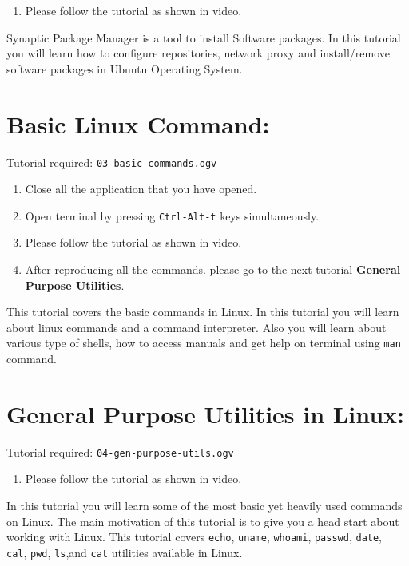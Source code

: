 \documentclass[11pt]{article}
\newenvironment{enumcpt}{\begin{enumerate} \topsep 0pt \partopsep 0pt 
                        \parsep 0pt
                        \itemsep 0pt \leftmargin -1in \rightmargin 0pt
                        }{\end{enumerate}}
\begin{document}
\begin{multicols}{2}
\begin{enumcpt}
\item Please follow the tutorial as shown in video.
\end{enumcpt}

 Synaptic Package Manager is a tool to install Software packages. In
 this tutorial you will learn how to configure repositories, network
 proxy and install/remove software packages in Ubuntu Operating
 System.

\section{Basic Linux Command:}
Tutorial required: {\tt 03-basic-commands.ogv} 

\begin{enumcpt}
\item Close all the application that you have opened.
\item Open terminal by pressing {\tt Ctrl-Alt-t} keys simultaneously.
\item Please follow the tutorial as shown in video.
\item After reproducing all the commands. please go to the next
  tutorial \textbf {General Purpose Utilities}.
\end{enumcpt}

This tutorial covers the basic commands in Linux. In this tutorial you
will learn about linux commands and a command interpreter. Also you will
learn about various type of shells, how to access manuals and get
help on terminal using {\tt man} command.

\section{General Purpose Utilities in Linux:}
Tutorial required: {\tt 04-gen-purpose-utils.ogv} 

\begin{enumcpt}
\item Please follow the tutorial as shown in video.
\end{enumcpt}

In this tutorial you will learn some of the most basic yet heavily
used commands on Linux. The main motivation of this tutorial is to
give you a head start about working with Linux. This tutorial covers
{\tt echo}, {\tt uname}, {\tt whoami}, {\tt passwd}, {\tt date}, {\tt
  cal}, {\tt pwd}, {\tt ls},and {\tt cat} utilities available in
Linux.


\end{multicols}
\end{document}
